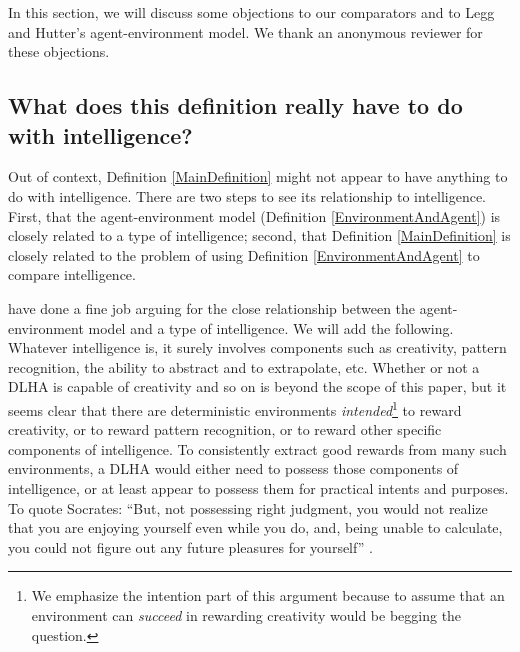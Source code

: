 \documentclass[twoside,11pt]{article}
\begin{document}
In this section, we will discuss some objections to our comparators and to
Legg and Hutter's agent-environment model. We thank an anonymous reviewer for
these objections.

\subsection{What does this definition really have to do with intelligence?}

Out of context, Definition \ref{MainDefinition} might not appear to have
anything to do with intelligence. There are two steps to see its relationship
to intelligence. First, that the agent-environment model
(Definition \ref{EnvironmentAndAgent}) is closely related to a type of
intelligence; second, that Definition \ref{MainDefinition} is closely related
to the problem of using Definition \ref{EnvironmentAndAgent} to compare intelligence.

\citet{hutter2007} have done a fine job arguing for the
close relationship between the agent-environment model and a type of intelligence.
We will add the following.
Whatever intelligence is, it surely involves components such as creativity,
pattern recognition, the ability to abstract and to extrapolate, etc.
Whether or not a DLHA is capable of creativity and so on is beyond the scope of
this paper, but it seems clear that there are deterministic environments
\emph{intended}\footnote{We emphasize the intention part
of this argument because to assume that an environment can \emph{succeed} in
rewarding creativity would be begging the question.} to reward creativity, or
to reward pattern
recognition, or to reward other specific components of intelligence.
To consistently extract good rewards from many such environments, a DLHA would
either need to possess
those components of intelligence, or at least appear to possess them for
practical intents and purposes. To quote Socrates:
``But, not possessing right judgment, you would not realize that you are
enjoying yourself even while you do, and, being unable to calculate,
you could not figure out any future pleasures for yourself''
\citep{philebus}.
\end{document}
